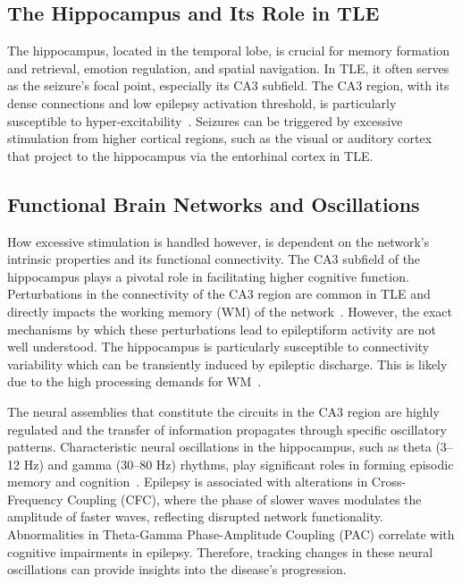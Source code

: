 \subsection{The Hippocampus and Its Role in TLE}
The hippocampus, located in the temporal lobe, is crucial for memory formation 
and retrieval, emotion regulation, and spatial navigation. In TLE, it often 
serves as the seizure's focal point, especially its CA3 subfield. The CA3 region, 
with its dense connections and low epilepsy activation threshold, is particularly 
susceptible to hyper-excitability~\parencite{witterIntrinsicExtrinsicWiring2007}. 
Seizures can be triggered by excessive stimulation from higher cortical regions, such as the visual or auditory cortex
that project to the hippocampus via the entorhinal cortex in TLE\@.

\subsection{Functional Brain Networks and Oscillations}
How excessive stimulation is handled however, is dependent on the network's intrinsic properties and its functional connectivity.
The CA3 subfield of the hippocampus plays a pivotal role in facilitating higher cognitive function. 
Perturbations in the connectivity of the CA3 region are common in TLE and directly impacts the working memory (WM)
of the network~\parencite{arskiOscillatoryBasisWorking2021}. However, the exact mechanisms by which these perturbations lead to epileptiform 
activity are not well understood. The hippocampus is particularly susceptible to connectivity variability which can be transiently induced by epileptic discharge. 
This is likely due to the high processing demands for WM~\parencite{aldenkampEffectsEpileptiformEEG2004}.

The neural assemblies that constitute the circuits in the CA3 region are highly regulated and the transfer of 
information propagates through specific oscillatory patterns. 
Characteristic neural oscillations in the hippocampus, such as theta (3--12 Hz) 
and gamma (30--80 Hz) rhythms, play significant roles in forming episodic memory and cognition~\parencite{nyhusFunctionalRoleGamma2010}. 
Epilepsy is associated with alterations in Cross-Frequency Coupling (CFC), where 
the phase of slower waves modulates the amplitude of faster waves, reflecting 
disrupted network functionality. Abnormalities in Theta-Gamma Phase-Amplitude 
Coupling (PAC) correlate with cognitive impairments in epilepsy. Therefore, tracking changes
in these neural oscillations can provide insights into the disease's progression.

